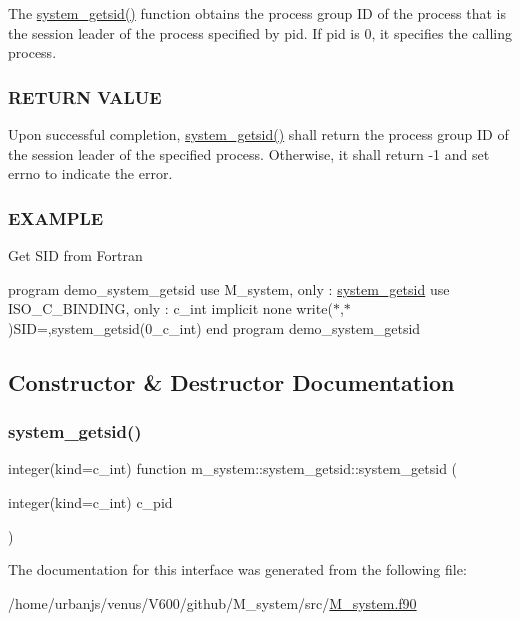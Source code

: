 The \mbox{\hyperlink{interfacem__system_1_1system__getsid_a0a665987d35f0b81a2358df6c0173122}{system\+\_\+getsid()}} function obtains the process group ID of the process that is the session leader of the process specified by pid. If pid is 0, it specifies the calling process. \subsubsection*{R\+E\+T\+U\+RN V\+A\+L\+UE}

Upon successful completion, \mbox{\hyperlink{interfacem__system_1_1system__getsid_a0a665987d35f0b81a2358df6c0173122}{system\+\_\+getsid()}} shall return the process group ID of the session leader of the specified process. Otherwise, it shall return -\/1 and set errno to indicate the error. \subsubsection*{E\+X\+A\+M\+P\+LE}

Get S\+ID from Fortran

program demo\+\_\+system\+\_\+getsid use M\+\_\+system, only \+: \mbox{\hyperlink{interfacem__system_1_1system__getsid}{system\+\_\+getsid}} use I\+S\+O\+\_\+\+C\+\_\+\+B\+I\+N\+D\+I\+NG, only \+: c\+\_\+int implicit none write($\ast$,$\ast$)\textquotesingle{}S\+ID=\textquotesingle{},system\+\_\+getsid(0\+\_\+c\+\_\+int) end program demo\+\_\+system\+\_\+getsid 

\subsection{Constructor \& Destructor Documentation}
\mbox{\label{interfacem__system_1_1system__getsid_a0a665987d35f0b81a2358df6c0173122}} 
\subsubsection{\texorpdfstring{system\+\_\+getsid()}{system\_getsid()}}
{\footnotesize\ttfamily integer(kind=c\+\_\+int) function m\+\_\+system\+::system\+\_\+getsid\+::system\+\_\+getsid (\begin{DoxyParamCaption}\item[{integer(kind=c\+\_\+int)}]{c\+\_\+pid }\end{DoxyParamCaption})\hspace{0.3cm}{\ttfamily [private]}}



The documentation for this interface was generated from the following file\+:\begin{DoxyCompactItemize}
\item 
/home/urbanjs/venus/\+V600/github/\+M\+\_\+system/src/\mbox{\hyperlink{M__system_8f90}{M\+\_\+system.\+f90}}\end{DoxyCompactItemize}
